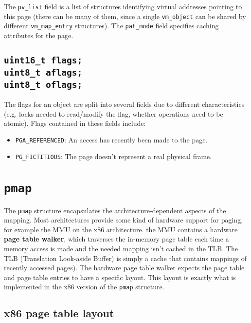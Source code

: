 \documentclass[shortabstract, english]{iithesis}
\begin{document}
The \texttt{pv_list} field is a list of structures identifying virtual
addresses pointing to this page (there can be many of them, since a single
\texttt{vm_object} can be shared by different
\texttt{vm_map_entry} structures). The \texttt{pat_mode} field
specifies caching attributes for the page.

\subsection*{\texttt{uint16_t flags;} \\ \texttt{uint8_t aflags;}
  \\ \texttt{uint8_t oflags;}}

The flags for an object are split into several fields due to different
characteristics (e.g. locks needed to read/modify the flag, whether operations
need to be atomic). Flags contained in these fields include:

\begin{itemize}
  \item \texttt{PGA_REFERENCED}: An access has recently been made to the page.
  \item \texttt{PG_FICTITIOUS}: The page doesn't represent a real physical frame.
\end{itemize}


\section{\texttt{pmap}}

The \texttt{pmap} structure encapsulates the architecture-dependent
aspects of the mapping. Most architectures provide some kind of hardware support
for paging, for example the MMU on the x86 architecture. the MMU contains a
hardware \textbf{page table walker}, which traverses the in-memory page table
each time a memory access is made and the needed mapping isn't cached in the
TLB. The TLB (Translation Look-aside Buffer) is simply a cache that contains
mappings of recently accessed pages). The hardware page table walker expects the
page table and page table entries to have a specific layout. This layout is
exactly what is implemented in the x86 version of the \texttt{pmap}
structure.

\subsection{x86 page table layout}
\end{document}
